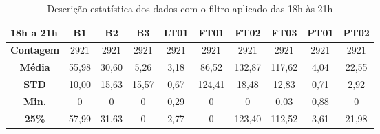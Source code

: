 \begin{table}[!htb]
	\centering
	\caption{Descrição estatística dos dados com o filtro aplicado das 18h às 21h}\label{tb:est}
	\begin{tabular}{@{}cccccccccc@{}}
\toprule
\multicolumn{1}{l}{\textbf{18h a 21h}} & \multicolumn{1}{c}{\textbf{B1}} & \multicolumn{1}{c}{\textbf{B2}} & \multicolumn{1}{c}{\textbf{B3}} & \multicolumn{1}{c}{\textbf{LT01}} & \multicolumn{1}{c}{\textbf{FT01}} & \multicolumn{1}{c}{\textbf{FT02}} & \multicolumn{1}{c}{\textbf{FT03}} & \multicolumn{1}{c}{\textbf{PT01}} & \multicolumn{1}{c}{\textbf{PT02}} \\ \midrule
\textbf{Contagem}                      & 2921                            & 2921                            & 2921                            & 2921                              & 2921                              & 2921                              & 2921                              & 2921                              & 2921                              \\
\textbf{Média}                         & 55,98                           & 30,60                           & 5,26                            & 3,18                              & 86,52                             & 132,87                            & 117,62                            & 4,04                              & 22,55                             \\
\textbf{STD}                           & 10,00                           & 15,63                           & 15,57                           & 0,67                              & 124,41                            & 18,48                             & 12,83                             & 0,71                              & 2,92                              \\
\textbf{Min.}                          & 0                               & 0                               & 0                               & 0,29                              & 0                                 & 0                                 & 0,03                              & 0,88                              & 0                                 \\
\textbf{25\%}                          & 57,99                           & 31,63                           & 0                               & 2,77                              & 0                                 & 123,40                            & 112,52                            & 3,61                              & 21,98                             \\

\end{tabular}
\end{table}
